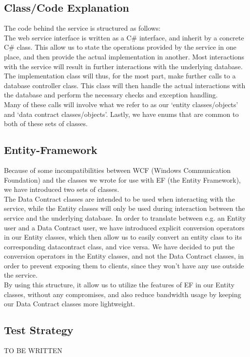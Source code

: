 \documentclass[10pt,a4paper]{article}
\begin{document}
\subsection{Class/Code Explanation}
The code behind the service is structured as follows:\\
The web service interface is written as a C\# interface, and inherit by a concrete C\# class. This allow us to state the operations provided by the service in one place, and then provide the actual implementation in another. Most interactions with the service will result in further interactions with the underlying database. The implementation class will thus, for the most part, make further calls to a database controller class. This class will then handle the actual interactions with the database and perform the necessary checks and exception handling.\\
Many of these calls will involve what we refer to as our ‘entity classes/objects’ and ‘data contract classes/objects’. Lastly, we have enums that are common to both of these sets of classes.

\subsection{Entity-Framework}
Because of some incompatibilities between WCF (Windows Communication Foundation) and the classes we wrote for use with EF (the Entity Framework), we have introduced two sets of classes.\\
The Data Contract classes are intended to be used when interacting with the service, while the  Entity classes will only be used during interaction between the service and the underlying database. In order to translate between e.g. an Entity user and a Data Contract user, we have introduced explicit conversion operators in our Entity classes, which then allow us to easily convert an entity class to its corresponding datacontract class, and vice versa. We have decided to put the conversion operators in the Entity classes, and not the Data Contract classes, in order to prevent exposing them to clients, since they won’t have any use outside the service. \\
By using this structure, it allow us to utilize the features of EF in our Entity classes, without any compromises, and also reduce bandwidth usage by keeping our Data Contract classes more lightweight.

\subsection{Test Strategy}
TO BE WRITTEN
\end{document}
